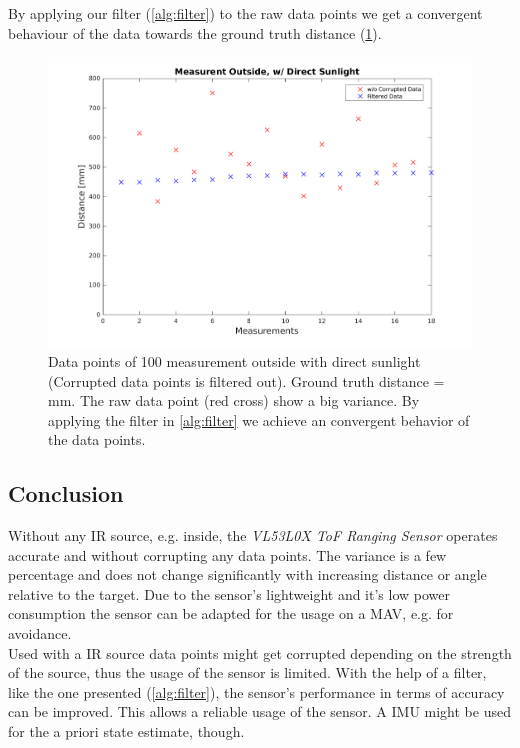 By applying our filter  (\cref{alg:filter}) to the raw data points we get a convergent behaviour of the data towards the ground truth distance (\cref{fig:meas_filter}).



\begin{figure}
	\centering
	\includegraphics[width=0.9\linewidth]{pictures/plot_filter_outside.pdf}
	\caption{Data points of 100 measurement outside with direct sunlight (Corrupted data points is filtered out). Ground truth distance = \unit[500]{mm}. The raw data point (red cross) show a big variance. By applying the filter in \cref{alg:filter} we achieve an convergent behavior of the data points.}
	\label{fig:meas_filter}
\end{figure}



\subsection{Conclusion}
Without any IR source, e.g. inside, the \textit{VL53L0X ToF Ranging Sensor} operates accurate and without corrupting any data points. The variance is a few percentage and does not change significantly with increasing distance or angle relative to the target. Due to the sensor's lightweight and it's low power consumption the sensor can be adapted for the usage on a MAV, e.g. for avoidance. \\
Used with a IR source data points might get corrupted depending on the strength of the source, thus the usage of the sensor is limited. With the help of a filter, like the one presented (\cref{alg:filter}), the sensor's performance in terms of accuracy can be improved. This allows a reliable usage of the sensor. A IMU might be used for the a priori state estimate, though. \\

